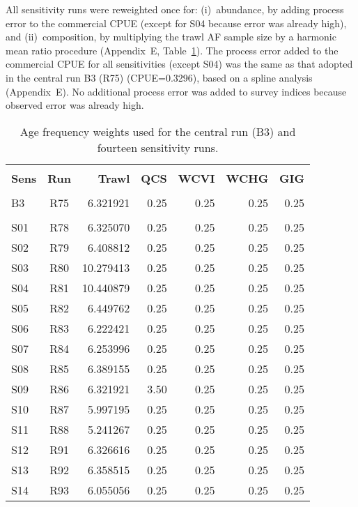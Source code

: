 \documentclass[11pt]{book}
\newcommand{\AppEqn}{Appendix~E}
\begin{document}
All sensitivity runs were reweighted once for: (i)~abundance, by adding process error to the commercial CPUE (except for S04 because error was already high), and (ii)~composition, by multiplying the trawl AF sample size by a harmonic mean ratio procedure (\AppEqn, Table~\ref{tab:sensAFwts}).
The process error added to the commercial CPUE for all sensitivities (except S04) was the same as that adopted in the central run B3 (R75) (CPUE=0.3296), based on a spline analysis (\AppEqn).
No additional process error was added to survey indices because observed error was already high.

\setlength{\tabcolsep}{4pt}
\begin{table}[!h]
\centering
\caption{Age frequency weights used for the central run (B3) and fourteen sensitivity runs.}
\label{tab:sensAFwts}
\usefont{\encodingdefault}{\familydefault}{\seriesdefault}{\shapedefault}\small
\begin{tabular}{lcrrrrr}
\hline \\ [-1.5ex]
{\bf Sens} & {\bf Run} & {\bf Trawl} & {\bf QCS} & {\bf WCVI} & {\bf WCHG} & {\bf GIG} \\ [0.2ex]
\hline \\ [-1.5ex]
B3 & R75 & 6.321921 & 0.25 & 0.25 & 0.25 & 0.25 \\
\hdashline \\ [-1.75ex]
S01 & R78 &  6.325070 & 0.25 & 0.25 & 0.25 & 0.25 \\
S02 & R79 &  6.408812 & 0.25 & 0.25 & 0.25 & 0.25 \\
S03 & R80 & 10.279413 & 0.25 & 0.25 & 0.25 & 0.25 \\
S04 & R81 & 10.440879 & 0.25 & 0.25 & 0.25 & 0.25 \\
S05 & R82 &  6.449762 & 0.25 & 0.25 & 0.25 & 0.25 \\
S06 & R83 &  6.222421 & 0.25 & 0.25 & 0.25 & 0.25 \\
S07 & R84 &  6.253996 & 0.25 & 0.25 & 0.25 & 0.25 \\
S08 & R85 &  6.389155 & 0.25 & 0.25 & 0.25 & 0.25 \\
S09 & R86 &  6.321921 & 3.50 & 0.25 & 0.25 & 0.25 \\
S10 & R87 &  5.997195 & 0.25 & 0.25 & 0.25 & 0.25 \\
S11 & R88 &  5.241267 & 0.25 & 0.25 & 0.25 & 0.25 \\
S12 & R91 &  6.326616 & 0.25 & 0.25 & 0.25 & 0.25 \\
S13 & R92 &  6.358515 & 0.25 & 0.25 & 0.25 & 0.25 \\
S14 & R93 &  6.055056 & 0.25 & 0.25 & 0.25 & 0.25 \\
\hline
\end{tabular}
\usefont{\encodingdefault}{\familydefault}{\seriesdefault}{\shapedefault}\normalsize
\end{table}
\end{document}
